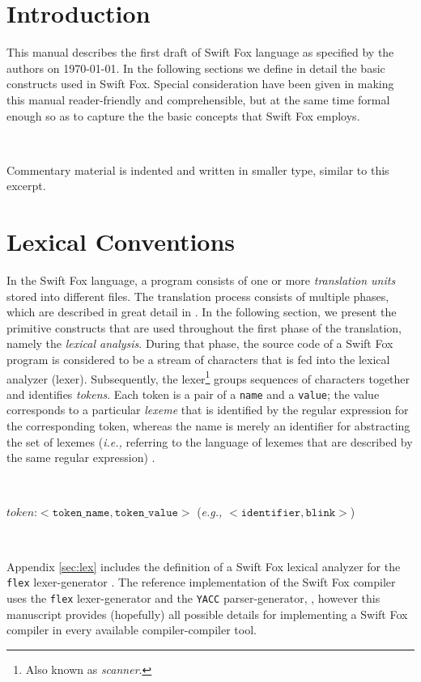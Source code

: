 \section{Introduction}
\label{sec:manual_introduction}

This manual describes the first draft of Swift Fox language as specified by
the authors on \today. In the following sections we define in detail the
basic constructs used in Swift Fox. Special consideration have been given in
making this manual reader-friendly and comprehensible, but at the same time
formal enough so as to capture the the basic concepts that Swift Fox 
employs.

\

\hangindent=4cm
\small
\noindent
Commentary material is indented and written in smaller type, similar to
this excerpt.
\normalsize

\section{Lexical Conventions}
\label{sec:lexical_conventions}

In the Swift Fox language, a program consists of one or more
\textit{translation units} stored into different files. The translation
process consists of multiple phases, which are described in great detail in 
\cite{marcin:tutorial}. In the following section, we present the primitive 
constructs that are used throughout the first phase of the translation,
namely the \textit{lexical analysis}. During that phase, the source code of
a Swift Fox program is considered to be a stream of characters that is fed
into the lexical analyzer (lexer). Subsequently, the lexer\footnote{Also
known as \textit{scanner}.} groups sequences of characters together and
identifies \textit{tokens}. Each token is a pair of a \texttt{name} and a
\texttt{value}; the value corresponds to a particular \textit{lexeme} that 
is identified by the regular expression for the corresponding token,
whereas the name is merely an identifier for abstracting the set of lexemes
(\textit{i.e.,} referring to the language of lexemes that are described by 
the same regular expression) \cite{aho:2007}.

\

$\textit{token:} <\texttt{token\_name}, \texttt{token\_value}>$
(\textit{e.g.,} $<\texttt{identifier}, \texttt{blink}>$)

\

\hangindent=4cm
\small
\noindent
Appendix \ref{sec:lex} includes the definition of a Swift Fox lexical
analyzer for the \texttt{flex} lexer-generator \cite{lesk:1990,paxson:2010}.
The reference implementation of the Swift Fox compiler uses the
\texttt{flex} lexer-generator and the \texttt{YACC} parser-generator,
\cite{johnson:1975,bison:2010}, however this manuscript provides
(hopefully) all possible details for implementing a Swift Fox compiler in
every available compiler-compiler tool.
\normalsize

